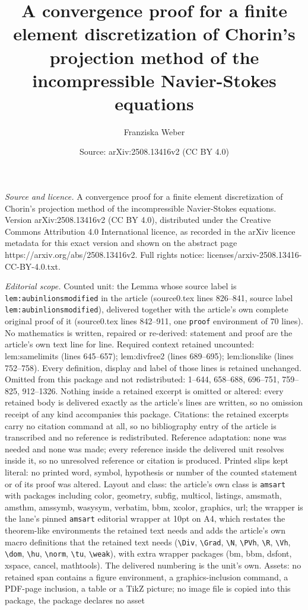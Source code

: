 \documentclass[10pt,a4paper]{amsart}
\title[A convergence proof for a finite element discretization of C]{A convergence proof for a finite element discretization of Chorin's projection method of the incompressible Navier-Stokes equations}
\author{Franziska Weber}
\date{Source: arXiv:2508.13416v2 (CC BY 4.0)}
\begin{document}
\maketitle

\noindent\emph{Source and licence.} A convergence proof for a finite element discretization of Chorin's projection method of the incompressible Navier-Stokes equations. Version arXiv:2508.13416v2 (CC BY 4.0), distributed under the Creative Commons Attribution 4.0 International licence, as recorded in the arXiv licence metadata for this exact version and shown on the abstract page https://arxiv.org/abs/2508.13416v2. Full rights notice: licenses/arxiv-2508.13416-CC-BY-4.0.txt.\par\smallskip

\noindent\textit{Editorial scope.} Counted unit: the Lemma whose source label is \texttt{lem:aubinlionsmodified} in the article (source0.tex lines 826--841, source label \texttt{lem:aubinlionsmodified}), delivered together with the article's own complete original proof of it (source0.tex lines 842--911, one \texttt{proof} environment of 70 lines). No mathematics is written, repaired or re-derived: statement and proof are the article's own text line for line. Required context retained uncounted: lem:samelimits (lines 645--657); lem:divfree2 (lines 689--695); lem:lionslike (lines 752--758). Every definition, display and label of those lines is retained unchanged. Omitted from this package and not redistributed: 1--644, 658--688, 696--751, 759--825, 912--1326. Nothing inside a retained excerpt is omitted or altered: every retained body is delivered exactly as the article's lines are written, so no omission receipt of any kind accompanies this package. Citations: the retained excerpts carry no citation command at all, so no bibliography entry of the article is transcribed and no reference is redistributed. Reference adaptation: none was needed and none was made; every reference inside the delivered unit resolves inside it, so no unresolved reference or citation is produced. Printed slips kept literal: no printed word, symbol, hypothesis or number of the counted statement or of its proof was altered. Layout and class: the article's own class is \texttt{amsart} with packages including color, geometry, subfig, multicol, listings, amsmath, amsthm, amssymb, wasysym, verbatim, bbm, xcolor, graphics, url; the wrapper is the lane's pinned \texttt{amsart} editorial wrapper at 10pt on A4, which restates the theorem-like environments the retained text needs and adds the article's own macro definitions that the retained text needs (\texttt{\textbackslash Div}, \texttt{\textbackslash Grad}, \texttt{\textbackslash N}, \texttt{\textbackslash PVh}, \texttt{\textbackslash R}, \texttt{\textbackslash Vh}, \texttt{\textbackslash dom}, \texttt{\textbackslash hu}, \texttt{\textbackslash norm}, \texttt{\textbackslash tu}, \texttt{\textbackslash weak}), with extra wrapper packages (bm, bbm, dsfont, xspace, cancel, mathtools). The delivered numbering is the unit's own. Assets: no retained span contains a figure environment, a graphics-inclusion command, a PDF-page inclusion, a table or a TikZ picture; no image file is copied into this package, the package declares no asset 
\end{document}
